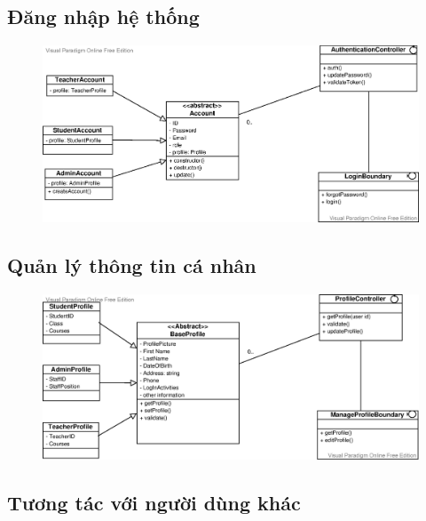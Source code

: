 \documentclass[./../main_file.tex]{subfiles}
\begin{document}
		\subsection{Đăng nhập hệ thống }
	\begin{figure}[H]
		\centering
		\includegraphics[width=\linewidth]{./images/VOPCs/3_1_LoginVOPC.eps}
	\end{figure}
	
	\subsection{Quản lý thông tin cá nhân  }
	\begin{figure}[H]
		\centering
		\includegraphics[width=\linewidth]{./images/VOPCs/3_2_ProfileManagementVOPC.eps}
	\end{figure}
	
	\subsection{Tương tác với người dùng khác }
\end{document}
